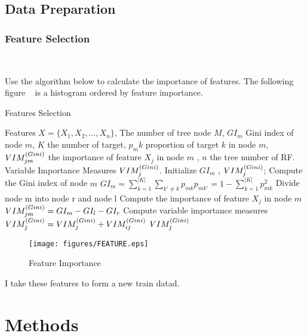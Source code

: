 \subsection{Data Preparation}



\subsubsection{Feature Selection}
\

Use the algorithm below to 
calculate the importance of features.
The following figure ~
is a histogram ordered by feature importance. 

\begin{algorithm}[htbp]
	\small
	\caption{Features Selection}
	\label{alg:features_selection}
	\begin{algorithmic}[1]
		\REQUIRE
		Features $X=\{ X_1, X_2, ... , X_n \}$,
		The number of tree node $M$,
		$GI_m$ Gini index of node $m$, 
		$ K $ the number of target,
		$ p_mk $ proportion of target $k$ in node $m$,
		$ VIM_{jm}^{\small(Gini)} $ the importance of feature $X_j$ in node $m$ ,
		$ n$ the tree number of RF.
		\ENSURE
		Variable Importance Measures $VIM_{j}^{\small(Gini)}$.
		\STATE
		Initialize $GI_m$ , 
		$VIM_{j}^{\small(Gini)} $;
		\STATE Compute the Gini index of node $m$
		$GI_m = \sum_{k=1}^{|K|} \sum_{k'\neq k} {p_{mk}}{p_{mk'}}=1- \sum_{k=1}^{|K|} p^2_{mk}$
		\ENDFOR
		\STATE Divide node m into node r and node l
		\STATE Compute the importance of feature $X_j$ in node $m$ 
		$VIM_{jm}^{\small(Gini)} = GI_m-GI_l-GI_r $
		\ENDFOR
		\STATE Compute variable importance measures 
		$VIM_{j}^{\small(Gini)} = VIM_{j}^{\small(Gini)} + VIM_{ij}^{\small(Gini)}$
		\ENDFOR
		\RETURN $VIM_{j}^{\small(Gini)}$
	\end{algorithmic}
\end{algorithm}

\begin{figure}[htbp]
	\centering
	\texttt{[image: figures/FEATURE.eps]}
	\caption{Feature Importance}\label{fig:feature_importance}
\end{figure}

I take these features 
to form a new train datad.


\section{Methods}

